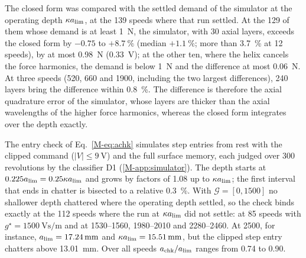 The closed form was compared with the settled demand of the simulator at the operating depth $\kappa a_{\lim}$, at the 139 speeds where that run settled. At the 129 of them whose demand is at least \SI{1}{\newton}, the simulator, with 30 axial layers, exceeds the closed form by $-0.75$ to $+\SI{8.7}{\percent}$ (median $+\SI{1.1}{\percent}$; more than \SI{3.7}{\percent} at 12 speeds), by at most \SI{0.98}{\newton} (\SI{0.33}{\volt}); at the other ten, where the helix cancels the force harmonics, the demand is below \SI{1}{\newton} and the difference at most \SI{0.06}{\newton}. At three speeds (520, 660 and \SI{1900}{\rpm}, including the two largest differences), 240 layers bring the difference within \SI{0.8}{\percent}. The difference is therefore the axial quadrature error of the simulator, whose layers are thicker than the axial wavelengths of the higher force harmonics, whereas the closed form integrates over the depth exactly.

The entry check of Eq.~\eqref{M-eq:achk} simulates step entries from rest with the clipped command ($\lvert V\rvert\le\SI{9}{\volt}$) and the full surface memory, each judged over 300 revolutions by the classifier D1 (\ref{M-app:simulator}). The depth starts at $0.225a_{\lim}=0.25\kappa a_{\lim}$ and grows by factors of 1.08 up to $\kappa a_{\lim}$; the first interval that ends in chatter is bisected to a relative \SI{0.3}{\percent}. With $\mathcal G=[0,1500]$ no shallower depth chattered where the operating depth settled, so the check binds exactly at the 112 speeds where the run at $\kappa a_{\lim}$ did not settle: at 85 speeds with $g^\star=\SI{1500}{\volt\second\per\metre}$ and at 1530--1560, 1980--2010 and 2280--\SI{2460}{\rpm}. At \SI{2500}{\rpm}, for instance, $a_{\lim}=\SI{17.24}{\milli\metre}$ and $\kappa a_{\lim}=\SI{15.51}{\milli\metre}$, but the clipped step entry chatters above \SI{13.01}{\milli\metre}. Over all speeds $a_{\mathrm{chk}}/a_{\lim}$ ranges from 0.74 to 0.90.

